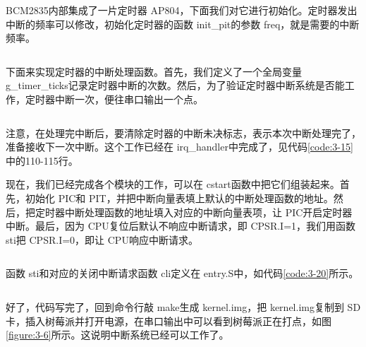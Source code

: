 \documentclass[main.tex]{subfiles}
\begin{document}
\begin{CJK*}{UTF8}{song}
\par
 BCM2835内部集成了一片定时器 AP804，下面我们对它进行初始化。定时器发出中断的频率可以修改，初始化定时器的函数 init\_\-pit的参数 freq，就是需要的中断频率。

\begin{code}
\label{code:3-18}
\inputminted[firstline=127,lastline=142,linenos,numbersep=5pt,frame=lines,framesep=2mm]{c}{src/chapter03/kernel/machdep.c}
\end{code}

下面来实现定时器的中断处理函数。首先，我们定义了一个全局变量 g\_\-timer\_\-ticks记录定时器中断的次数。然后，为了验证定时器中断系统是否能工作，定时器中断一次，便往串口输出一个点。

\begin{code}
\label{code:3-19}
\inputminted[firstline=5,lastline=15,linenos,numbersep=5pt,frame=lines,framesep=2mm]{c}{src/chapter03/kernel/timer.c}
\end{code}

注意，在处理完中断后，要清除定时器的中断未决标志，表示本次中断处理完了，准备接收下一次中断。这个工作已经在 irq\_\-handler中完成了，见代码\ref{code:3-15}中的110-115行。

\par
现在，我们已经完成各个模块的工作，可以在 cstart函数中把它们组装起来。首先，初始化 PIC和 PIT，并把中断向量表填上默认的中断处理函数的地址。然后，把定时器中断处理函数的地址填入对应的中断向量表项，让 PIC开启定时器中断。最后，因为 CPU复位后默认不响应中断请求，即 CPSR.I=1，我们用函数 sti把 CPSR.I=0，即让 CPU响应中断请求。

\begin{code}
\label{code:3-20}
\inputminted[firstline=144,lastline=176,linenos,numbersep=5pt,frame=lines,framesep=2mm]{c}{src/chapter03/kernel/machdep.c}
\end{code}

函数 sti和对应的关闭中断请求函数 cli定义在 entry.S中，如代码\ref{code:3-20}所示。

\begin{code}
\label{code:3-21}
\inputminted[firstline=155,lastline=168,linenos,numbersep=5pt,frame=lines,framesep=2mm]{gas}{src/chapter03/kernel/entry.S}
\end{code}

好了，代码写完了，回到命令行敲 make生成 kernel.img，把 kernel.img复制到 SD卡，插入树莓派并打开电源，在串口输出中可以看到树莓派正在打点，如图\ref{figure:3-6}所示。这说明中断系统已经可以工作了。


\end{CJK*}
\end{document}

